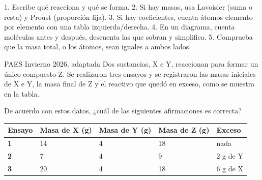\begin{clave} 1. Escribe qué reacciona y qué se forma. 2. Si hay masas, usa Lavoisier (suma o resta) y Proust (proporción fija). 3. Si hay coeficientes, cuenta átomos elemento por elemento con una tabla izquierda/derecha. 4. En un diagrama, cuenta moléculas antes y después, descuenta las que sobran y simplifica. 5. Comprueba que la masa total, o los átomos, sean iguales a ambos lados.\end{clave}
\begin{elejemplo}{PAES Invierno 2026, adaptada}
Dos sustancias, X e Y, reaccionan para formar un único compuesto Z. Se realizaron tres ensayos y se registraron las masas iniciales de X e Y, la masa final de Z y el reactivo que quedó en exceso, como se muestra en la tabla.

De acuerdo con estos datos, ¿cuál de las siguientes afirmaciones es correcta?
\begin{center}\small
\begin{tabular}{@{}lllll@{}}
\toprule
\textbf{Ensayo} & \textbf{Masa de X (g)} & \textbf{Masa de Y (g)} & \textbf{Masa de Z (g)} & \textbf{Exceso} \\
\midrule
\textbf{1} & 14 & 4 & 18 & nada \\
\textbf{2} & 7 & 4 & 9 & 2 g de Y \\
\textbf{3} & 20 & 4 & 18 & 6 g de X \\
\bottomrule
\end{tabular}
\end{center}
\end{elejemplo}
